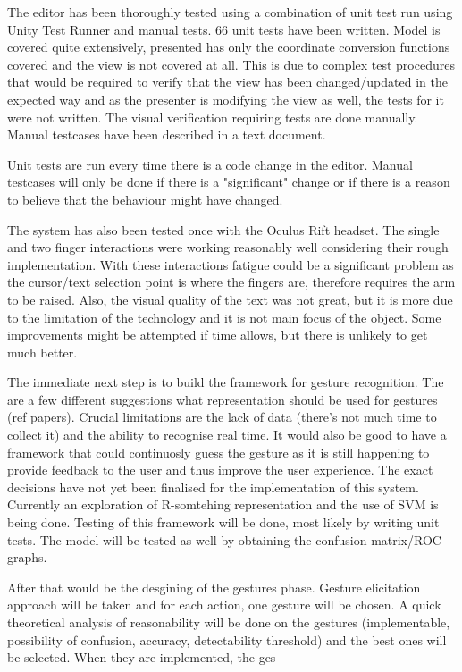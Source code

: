 \documentclass[a4paper, 12pt]{article}
\begin{document}

The editor has been thoroughly tested using a combination of unit test run using Unity Test Runner and manual tests. 66 unit tests have been written. Model is covered quite extensively, presented has only the coordinate conversion functions covered and the view is not covered at all. This is due to complex test procedures that would be required to verify that the view has been changed/updated in the expected way and as the presenter is modifying the view as well, the tests for it were not written. The visual verification requiring tests are done manually. Manual testcases have been described in a text document. 

Unit tests are run every time there is a code change in the editor. Manual testcases will only be done if there is a "significant" change or if there is a reason to believe that the behaviour might have changed.

The system has also been tested once with the Oculus Rift headset. The single and two finger interactions were working reasonably well considering their rough implementation. With these interactions fatigue could be a significant problem as the cursor/text selection point is where the fingers are, therefore requires the arm to be raised. Also, the visual quality of the text was not great, but it is more due to the limitation of the technology and it is not main focus of the object. Some improvements might be attempted if time allows, but there is unlikely to get much better.


The immediate next step is to build the framework for gesture recognition. The are a few different suggestions what representation should be used for gestures (ref papers). Crucial limitations are the lack of data (there's not much time to collect it) and the ability to recognise real time. It would also be good to have a framework that could continuosly guess the gesture as it is still happening to provide feedback to the user and thus improve the user experience. The exact decisions have not yet been finalised for the implementation of this system. Currently an exploration of R-somtehing representation and the use of SVM is being done. Testing of this framework will be done, most likely by writing unit tests. The model will be tested as well by obtaining the confusion matrix/ROC graphs.

After that would be the desgining of the gestures phase. Gesture elicitation approach will be taken and for each action, one gesture will be chosen. A quick theoretical analysis of reasonability will be done on the gestures (implementable, possibility of confusion, accuracy, detectability threshold) and the best ones will be selected. When they are implemented, the ges
\end{document}
